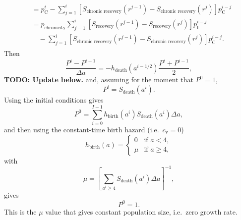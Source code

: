 \documentclass[12pt]{article}
\begin{document}
\begin{subequations}
\begin{align}
\begin{split}
      \\
      &= p_{\mathrm{C}}^i
      - \sum_{j = 1}^i \left[S_{\text{chronic recovery}}(r^{j - 1})
        - S_{\text{chronic recovery}}(r^j)\right]
      p_{\mathrm{C}}^{i - j}
      \\
      &= p_{\text{chronicity}}
      \sum_{j = 1}^i \left[S_{\text{recovery}}(r^{j - 1})
        - S_{\text{recovery}}(r^j)\right] p_{\mathrm{I}}^{i - j}
      \\ & \quad {}
      - \sum_{j = 1}^i \left[S_{\text{chronic recovery}}(r^{j - 1})
        - S_{\text{chronic recovery}}(r^j)\right]
      p_{\mathrm{C}}^{i - j}.
    \end{split}
  \end{align}
\end{subequations}
Then
\begin{equation}
  \frac{P^i - P^{i - 1}}{\Delta a}
  = - h_{\text{death}}(a^{i - 1 / 2})
  \frac{P^i + P^{i - 1}}{2},
\end{equation}
\textbf{TODO: Update below.}
and, assuming for the moment that $P^0 = 1$,
\begin{equation}
  P^i = S_{\text{death}}(a^i).
\end{equation}
Using the initial conditions gives
\begin{equation}
  P^0
  = \sum_{i = 0}^{I - 1}
  h_{\text{birth}}(a^i) S_{\text{death}}(a^i)
  \Delta a,
\end{equation}
and then using the constant-time birth hazard
(i.e.~$c_{\mathrm{v}} = 0$)
\begin{equation}
  h_{\text{birth}}(a) =
  \begin{cases}
    0 & \text{if $a < 4$}, \\
    \mu & \text{if $a \geq 4$},
  \end{cases}
\end{equation}
with
\begin{equation}
  \mu =
  \left[
    \sum_{a^i \geq 4}
    S_{\text{death}}(a^i)
    \Delta a
  \right]^{-1},
\end{equation}
gives
\begin{equation}
  P^0 = 1.
\end{equation}
This is the $\mu$ value that gives constant population size,
i.e.~zero growth rate.




\end{document}
